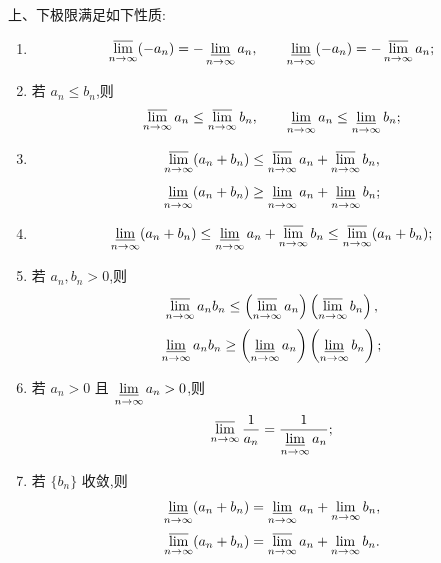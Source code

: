 \begin{theorem}[\markstar]
  上、下极限满足如下性质:
  \begin{enumerate}
    \item
          \[
            \varlimsup\limits_{n\to\infty}(-a_n)=-\varliminf\limits_{n\to\infty}a_n,
            \qquad
            \varliminf\limits_{n\to\infty}(-a_n)=-\varlimsup\limits_{n\to\infty}a_n;
          \]
    \item 若 $a_n\leq b_n$,则
          \[
            \varlimsup\limits_{n\to\infty}a_n\leq\varlimsup\limits_{n\to\infty}b_n,
            \qquad
            \varliminf\limits_{n\to\infty}a_n\leq\varliminf\limits_{n\to\infty}b_n;
          \]
    \item
          \[
            \varlimsup\limits_{n\to\infty}(a_n+b_n)
            \leq
            \varlimsup\limits_{n\to\infty}a_n+
            \varlimsup\limits_{n\to\infty}b_n,
          \]
          \[
            \varliminf\limits_{n\to\infty}(a_n+b_n)
            \geq
            \varliminf\limits_{n\to\infty}a_n+
            \varliminf\limits_{n\to\infty}b_n;
          \]
    \item
          \[
            \varliminf\limits_{n\to\infty}(a_n+b_n)
            \leq
            \varliminf\limits_{n\to\infty}a_n+
            \varlimsup\limits_{n\to\infty}b_n
            \leq
            \varlimsup\limits_{n\to\infty}(a_n+b_n);
          \]
    \item 若 $a_n,b_n>0$,则
          \[
            \varlimsup\limits_{n\to\infty}a_nb_n
            \leq
            \left(\varlimsup\limits_{n\to\infty}a_n\right)
            \left(\varlimsup\limits_{n\to\infty}b_n\right),
          \]
          \[
            \varliminf\limits_{n\to\infty}a_nb_n
            \geq
            \left(\varliminf\limits_{n\to\infty}a_n\right)
            \left(\varliminf\limits_{n\to\infty}b_n\right);
          \]
    \item 若 $a_n>0$ 且 $\displaystyle \varliminf\limits_{n\to\infty}a_n>0$,则
          \[
            \varlimsup\limits_{n\to\infty}\dfrac{1}{a_n}
            =
            \dfrac{1}{\displaystyle \varliminf\limits_{n\to\infty}a_n};
          \]
    \item 若 $\{b_n\}$ 收敛,则
          \[
            \varliminf\limits_{n\to\infty}(a_n+b_n)
            =
            \varliminf\limits_{n\to\infty}a_n+\lim\limits_{n\to\infty}b_n,
          \]
          \[
            \varlimsup\limits_{n\to\infty}(a_n+b_n)
            =
            \varlimsup\limits_{n\to\infty}a_n+\lim\limits_{n\to\infty}b_n.
          \]
  \end{enumerate}
\end{theorem}

